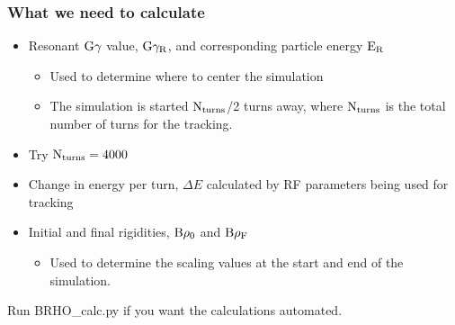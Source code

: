 \documentclass{beamer}
\begin{document}
\begin{frame}
\frametitle{What we need to calculate}

\begin{itemize}
\item Resonant $\rm G\gamma$ value, $\rm G\gamma_R$, and corresponding particle energy $\rm E_R$
\begin{itemize}
\item Used to determine where to center the simulation
\item The simulation is started $\rm N_{turns}$/2 turns away, where $\rm N_{turns}$ is the total number of turns for the tracking. 
\end{itemize}
\item Try $\rm N_{turns}=4000$
\item Change in energy per turn, $\Delta E$ calculated by RF parameters being used for tracking
\item Initial and final rigidities, $\rm B\rho_0$ and $\rm B\rho_F$
\begin{itemize}
\item Used to determine the scaling values at the start and end of the simulation.
\end{itemize}
\end{itemize}
Run BRHO\_calc.py if you want the calculations automated.
\end{frame}
\end{document}
